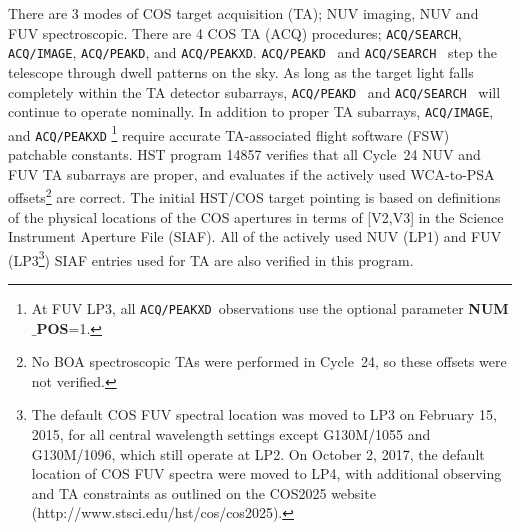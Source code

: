 \documentclass[12pt]{reportj}
\newcommand{\numpos}{{\bf NUM$\_$POS}\rm}
\begin{document}
There are 3 modes of COS target acquisition (TA); NUV imaging, NUV and FUV spectroscopic.
There are 4 COS TA (ACQ) procedures; \texttt{ACQ/SEARCH}, \texttt{ACQ/IMAGE}, \texttt{ACQ/PEAKD}, and \texttt{ACQ/PEAKXD}. \texttt{ACQ/PEAKD}~ and \texttt{ACQ/SEARCH}~ step the telescope through dwell patterns on the sky. As long as the target light falls completely within
the TA detector subarrays, \texttt{ACQ/PEAKD}~ and \texttt{ACQ/SEARCH}~ will continue to operate nominally.
In addition to proper TA subarrays, \texttt{ACQ/IMAGE}, and \texttt{ACQ/PEAKXD} \footnote{At FUV LP3, all \texttt{ACQ/PEAKXD}~observations use the optional parameter \numpos=1.} require accurate TA-associated flight software (FSW) patchable constants.
HST program 14857 verifies that all Cycle~24 NUV and FUV TA subarrays are proper, and evaluates if the actively used WCA-to-PSA offsets\footnote{No BOA spectroscopic TAs were performed in Cycle~24, so these offsets were not verified.} are correct.
The initial HST/COS target pointing is based on definitions of the physical locations of the COS apertures in terms of [V2,V3] in the Science Instrument Aperture File (SIAF).
All of the actively used NUV (LP1) and FUV (LP3\footnote{The default COS FUV spectral location was moved to LP3 on February 15, 2015, for all central wavelength settings except G130M/1055 and G130M/1096, which still operate at LP2. On October 2, 2017, the default location of COS FUV spectra were moved to LP4, with additional observing and TA constraints as outlined on the COS2025 website (http://www.stsci.edu/hst/cos/cos2025).}) SIAF entries used for TA are also verified in this program.
\end{document}
